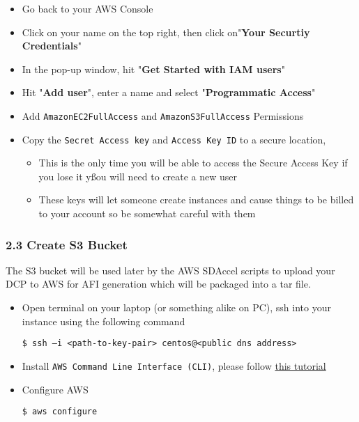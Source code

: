 \documentclass[]{article}
\begin{document}
\begin{itemize}
\item
  Go back to your AWS Console
\item
  Click on your name on the top right, then click on"\textbf{Your
  Securtiy Credentials}"
\item
  In the pop-up window, hit "\textbf{Get Started with IAM users}"
\item
  Hit "\textbf{Add user}", enter a name and select "\textbf{Programmatic
  Access}"
\item
  Add \texttt{AmazonEC2FullAccess} and \texttt{AmazonS3FullAccess}
  Permissions
\item
  Copy the \texttt{Secret\ Access\ key} and \texttt{Access\ Key\ ID} to
  a secure location,

  \begin{itemize}
  \item
    This is the only time you will be able to access the Secure Access
    Key if you lose it yßou will need to create a new user
  \item
    These keys will let someone create instances and cause things to be
    billed to your account so be somewhat careful with them
  \end{itemize}
\end{itemize}

\hypertarget{header-n232}{%
\subsubsection{2.3 Create S3 Bucket}\label{header-n232}}

The S3 bucket will be used later by the AWS SDAccel scripts to upload
your DCP to AWS for AFI generation which will be packaged into a tar
file.

\begin{itemize}
\item
  Open terminal on your laptop (or something alike on PC), ssh into your
  instance using the following command

\begin{verbatim}
$ ssh –i <path-to-key-pair> centos@<public dns address>
\end{verbatim}
\end{itemize}

\begin{itemize}
\item
  Install \texttt{AWS\ Command\ Line\ Interface\ (CLI)}, please follow
  \href{http://docs.aws.amazon.com/cli/latest/userguide/installing.html}{this
  tutorial}
\item
  Configure AWS

\begin{verbatim}
$ aws configure
\end{verbatim}
\end{itemize}
\end{document}
